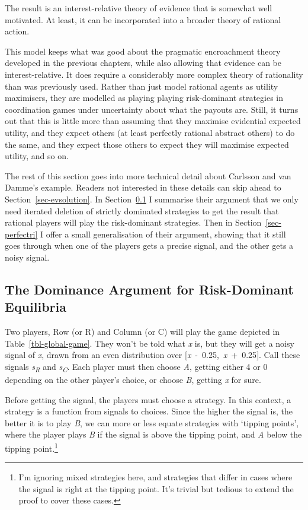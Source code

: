 \documentclass[
  10pt,
  letterpaper,
  twoside]{scrbook}
\begin{document}
The result is an interest-relative theory of evidence that is somewhat
well motivated. At least, it can be incorporated into a broader theory
of rational action.

This model keeps what was good about the pragmatic encroachment theory
developed in the previous chapters, while also allowing that evidence
can be interest-relative. It does require a considerably more complex
theory of rationality than was previously used. Rather than just model
rational agents as utility maximisers, they are modelled as playing
playing risk-dominant strategies in coordination games under uncertainty
about what the payouts are. Still, it turns out that this is little more
than assuming that they maximise evidential expected utility, and they
expect others (at least perfectly rational abstract others) to do the
same, and they expect those others to expect they will maximise expected
utility, and so on.

The rest of this section goes into more technical detail about Carlsson
and van Damme's example. Readers not interested in these details can
skip ahead to Section~\ref{sec-evsolution}. In
Section~\ref{sec-cvdproof} I summarise their argument that we only need
iterated deletion of strictly dominated strategies to get the result
that rational players will play the risk-dominant strategies. Then in
Section~\ref{sec-perfectri} I offer a small generalisation of their
argument, showing that it still goes through when one of the players
gets a precise signal, and the other gets a noisy signal.

\subsection{The Dominance Argument for Risk-Dominant
Equilibria}\label{sec-cvdproof}

Two players, Row (or R) and Column (or C) will play the game depicted in
Table~\ref{tbl-global-game}. They won't be told what \emph{x} is, but
they will get a noisy signal of \emph{x}, drawn from an even
distribution over {[}\emph{x}~-~0.25,~\emph{x}~+~0.25{]}. Call these
signals \emph{s\textsubscript{R}} and \emph{s\textsubscript{C}}. Each
player must then choose \emph{A}, getting either 4 or 0 depending on the
other player's choice, or choose \emph{B}, getting \emph{x} for sure.

Before getting the signal, the players must choose a strategy. In this
context, a strategy is a function from signals to choices. Since the
higher the signal is, the better it is to play \emph{B}, we can more or
less equate strategies with `tipping points', where the player plays
\emph{B} if the signal is above the tipping point, and \emph{A} below
the tipping point.\footnote{I'm ignoring mixed strategies here, and
  strategies that differ in cases where the signal is right at the
  tipping point. It's trivial but tedious to extend the proof to cover
  these cases.}
\end{document}
